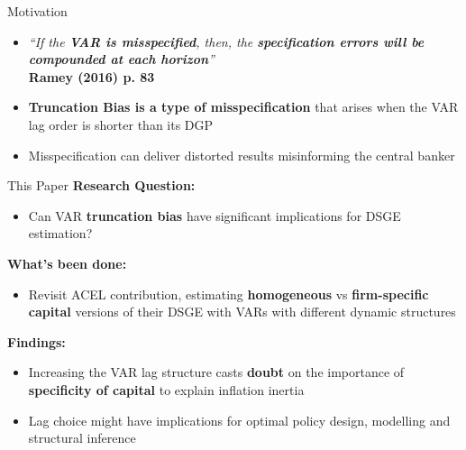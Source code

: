 \documentclass[11pt]{beamer}
\begin{document}

\begin{frame}{Motivation}
    \begin{itemize}
        \item \textit{``If the \textbf{VAR is misspecified}, then, the \textbf{specification errors will be compounded at each horizon}''}
        \vspace{0.1cm}
        \\
        \hfill {\small \textbf{Ramey (2016) p. 83} }
        \vspace{0.3cm}
        \pause
        
        \item \textcolor{PadovaRed}{\textbf{Truncation Bias is a type of misspecification}} that arises when the VAR lag order is shorter than its DGP
        \vspace{0.3cm}
        \pause

        \item Misspecification can deliver distorted results misinforming the central banker %
    \end{itemize}

\end{frame}


\begin{frame}{This Paper}\label{slide:this_paper}
    \textbf{Research Question:}
    \begin{itemize}
        \item {\textcolor{PadovaRed}{Can VAR \textbf{truncation bias} have significant implications for DSGE estimation?}}
    \end{itemize}
    
    \vspace{0.4cm}
    \textbf{What's been done:}
    \begin{itemize}
        \item Revisit ACEL contribution, estimating \textcolor{PadovaRed}{\textbf{homogeneous}} vs \textcolor{PadovaRed}{\textbf{firm-specific capital}} versions of their DSGE with VARs with different dynamic structures
    \end{itemize}
    \pause
    
    \vspace{0.4cm}    
    \textbf{Findings:}
    \begin{itemize}
        \item Increasing the VAR lag structure casts \textcolor{PadovaRed}{\textbf{doubt}} on the importance of \textcolor{PadovaRed}{\textbf{specificity of capital}} to explain inflation inertia
        \item Lag choice might have implications for optimal policy design, modelling and structural inference
    \end{itemize}
\end{frame}
\end{document}
